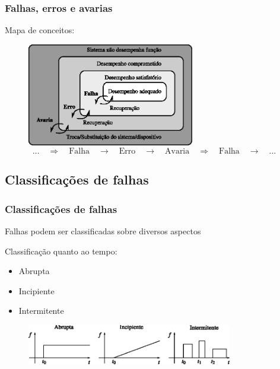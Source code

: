 \documentclass{beamer}
\begin{document}
\begin{frame}
    \frametitle{Falhas, erros e avarias}

    Mapa de conceitos:

\begin{figure}[htb]
\centering
    \includegraphics[width=0.65\textwidth]{imgs/detec_diag/eps/mapa_conceitos}
\[
\ldots
\quad\Longrightarrow\quad
\text{Falha} 
\quad\longrightarrow\quad
\text{Erro}
\quad\longrightarrow\quad
\text{Avaria}
\quad\Longrightarrow\quad
\text{Falha}
\quad\longrightarrow\quad
\ldots
\]
\end{figure}

\end{frame}

\subsection{Classificações de falhas}
\begin{frame}
    \frametitle{Classificações de falhas}

    Falhas podem ser classificadas sobre diversos aspectos

    \vspace{0.25cm}

    Classificação quanto ao tempo:

\begin{itemize}
    \item Abrupta
    \item Incipiente
    \item Intermitente
\end{itemize}

\begin{figure}[htb]
\centering
    \includegraphics[width=0.8\textwidth]{imgs/detec_diag/eps/tipos_falha}
\end{figure}
\end{frame}
\end{document}
